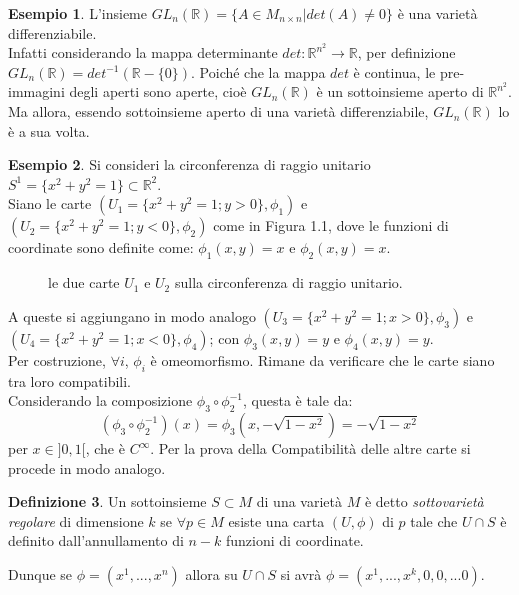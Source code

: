 \documentclass[12pt,a4paper]{report}
\theoremstyle{definition}
\newtheorem{Def}{Definizione}[chapter]
\theoremstyle{definition}
\newtheorem{Ex}[Def]{Esempio}
\theoremstyle{definition}
\theoremstyle{remark}
\begin{document}
\begin{Ex}
	L'insieme $GL_n(\mathbb{R})=\{A\in M_{n\times n}|det(A)\neq0\}$ è una varietà differenziabile.\\
	Infatti considerando la mappa determinante $det:\mathbb{R}^{n^2}\rightarrow \mathbb{R}$, per definizione $GL_n(\mathbb{R})=det^{-1}(\mathbb{R}-\{0\})$. Poiché che la mappa $det$ è continua, le pre-immagini degli aperti sono aperte, cioè $GL_n(\mathbb{R})$ è un sottoinsieme aperto di $\mathbb{R}^{n^2}$.\\
	Ma allora, essendo sottoinsieme aperto di una varietà differenziabile, $GL_n(\mathbb{R})$ lo è a sua volta.\\
\end{Ex}
\begin{Ex}
	Si consideri la circonferenza di raggio unitario $S^1=\{x^2+y^2=1\}\subset \mathbb{R}^2$.\\
	Siano le carte $(U_1=\{x^2+y^2=1;y>0\},\phi_1)$ e $(U_2=\{x^2+y^2=1;y<0\},\phi_2)$ come in Figura 1.1, dove le funzioni di coordinate sono definite come: $\phi_1(x,y)=x$ e $\phi_2(x,y)=x$.
	\begin{figure}[H]
		\centering
	\label{figura 1}
	\caption{le due carte $U_1$ e $U_2$ sulla circonferenza di raggio unitario.}
	\end{figure}
A queste si aggiungano in modo analogo $(U_3=\{x^2+y^2=1;x>0\},\phi_3)$ e $(U_4=\{x^2+y^2=1;x<0\},\phi_4)$; con $\phi_3(x,y)=y$ e $\phi_4(x,y)=y$.\\
Per costruzione, $\forall i$, $\phi_i$ è omeomorfismo. Rimane da verificare che le carte siano tra loro compatibili.\\
Considerando la composizione $\phi_3\circ\phi_2^{-1}$, questa è tale da: $$(\phi_3\circ\phi_2^{-1})(x)=\phi_3(x,-\sqrt{1-x^2})=-\sqrt{1-x^2}$$ per $x\in ]0,1[$, che è $C^\infty$. Per la prova della Compatibilità delle altre carte si procede in modo analogo.\\ 
\end{Ex}
\begin{Def}
	Un sottoinsieme $S\subset M$ di una varietà $M$ è detto \textit{sottovarietà regolare} di dimensione $k$ se $\forall p\in M$ esiste una carta $(U,\phi)$ di $p$ tale che $U\cap S$ è definito dall'annullamento di $n-k$ funzioni di coordinate.
\end{Def}
Dunque se $\phi=(x^1,...,x^n)$ allora su $U\cap S$ si avrà $\phi=(x^1,...,x^k,0,0,...0)$.
\end{document}
